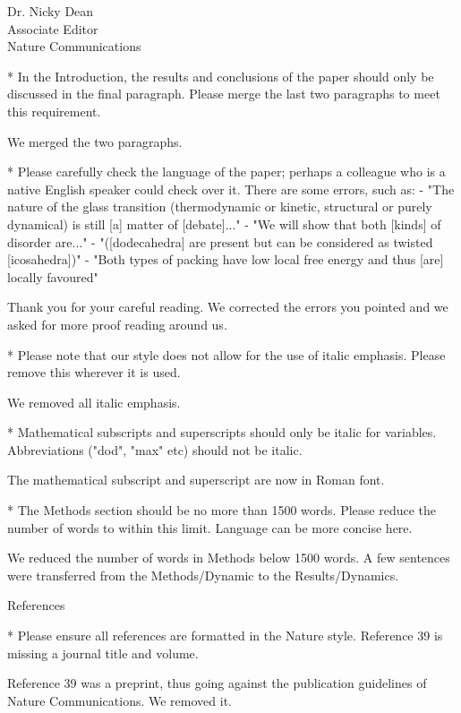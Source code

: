 \documentclass[a4paper, rebuttal, parskip=true, firsthead=false, fromemail=true, foldmarks=false]{scrlttr2}
\begin{document}
\begin{letter}{Dr. Nicky Dean\\
Associate Editor\\
Nature Communications}
\begin{quotationi}
* In the Introduction, the results and conclusions of the paper should only be discussed in the final paragraph. Please merge the last two paragraphs to meet this requirement.
\end{quotationi}
We merged the two paragraphs.

\begin{quotationi}
* Please carefully check the language of the paper; perhaps a colleague who is a native English speaker could check over it. There are some errors, such as:
- "The nature of the glass transition (thermodynamic or kinetic, structural or purely dynamical) is still [a] matter of [debate]..."
- "We will show that both [kinds] of disorder are..."
- "([dodecahedra] are present but can be considered as twisted [icosahedra])"
- "Both types of packing have low local free energy and thus [are] locally favoured"
\end{quotationi}
Thank you for your careful reading. We corrected the errors you pointed and we asked for more proof reading around us.

\begin{quotationi}
* Please note that our style does not allow for the use of italic emphasis. Please remove this wherever it is used.
\end{quotationi}
We removed all italic emphasis.

\begin{quotationi}
* Mathematical subscripts and superscripts should only be italic for variables. Abbreviations ("dod", "max" etc) should not be italic.
\end{quotationi}
The mathematical subscript and superscript are now in Roman font.

\begin{quotationi}
* The Methods section should be no more than 1500 words. Please reduce the number of words to within this limit. Language can be more concise here.
\end{quotationi}
We reduced the number of words in Methods below 1500 words. A few sentences were transferred from the Methods/Dynamic to the Results/Dynamics.

\textsf{References}
\begin{quotationi}
* Please ensure all references are formatted in the Nature style. Reference 39 is missing a journal title and volume.
\end{quotationi}
Reference 39 was a preprint, thus going against the publication guidelines of Nature Communications. We removed it.


\end{letter}
\end{document}
